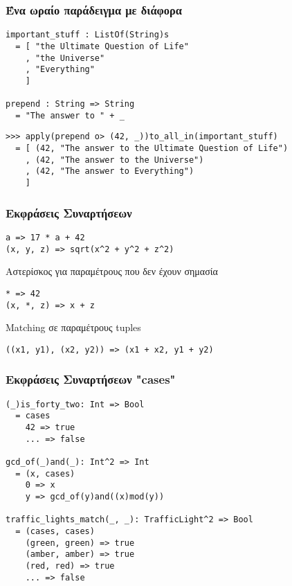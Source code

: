 \documentclass{beamer}
\def\e{\foreignlanguage{english}}
\begin{document}
\begin{frame}[fragile]

\frametitle{Ένα ωραίο παράδειγμα με διάφορα}


\begin{otherlanguage}{english}
\begin{verbatim}
important_stuff : ListOf(String)s
  = [ "the Ultimate Question of Life"
    , "the Universe"
    , "Everything"
    ]

prepend : String => String
  = "The answer to " + _
\end{verbatim}

\begin{verbatim}
>>> apply(prepend o> (42, _))to_all_in(important_stuff)
  = [ (42, "The answer to the Ultimate Question of Life")
    , (42, "The answer to the Universe")
    , (42, "The answer to Everything")
    ]
\end{verbatim}
\end{otherlanguage}

\end{frame}

\begin{frame}[fragile]

\frametitle{Εκφράσεις Συναρτήσεων}

\begin{otherlanguage}{english}
\begin{verbatim}
a => 17 * a + 42
(x, y, z) => sqrt(x^2 + y^2 + z^2)
\end{verbatim}
\end{otherlanguage}
Αστερίσκος για παραμέτρους που δεν έχουν σημασία
\begin{otherlanguage}{english}
\begin{verbatim}
* => 42
(x, *, z) => x + z
\end{verbatim}
\end{otherlanguage}
\e{Matching} σε παραμέτρους \e{tuples}
\begin{otherlanguage}{english}
\begin{verbatim}
((x1, y1), (x2, y2)) => (x1 + x2, y1 + y2)
\end{verbatim}
\end{otherlanguage}

\end{frame}

\begin{frame}[fragile]

\frametitle{Εκφράσεις Συναρτήσεων \e{"cases"}}

\begin{otherlanguage}{english}
\begin{verbatim}
(_)is_forty_two: Int => Bool
  = cases
    42 => true
    ... => false

gcd_of(_)and(_): Int^2 => Int
  = (x, cases)
    0 => x
    y => gcd_of(y)and((x)mod(y))

traffic_lights_match(_, _): TrafficLight^2 => Bool
  = (cases, cases)
    (green, green) => true
    (amber, amber) => true
    (red, red) => true
    ... => false
\end{verbatim}
\end{otherlanguage}

\end{frame}
\end{document}
